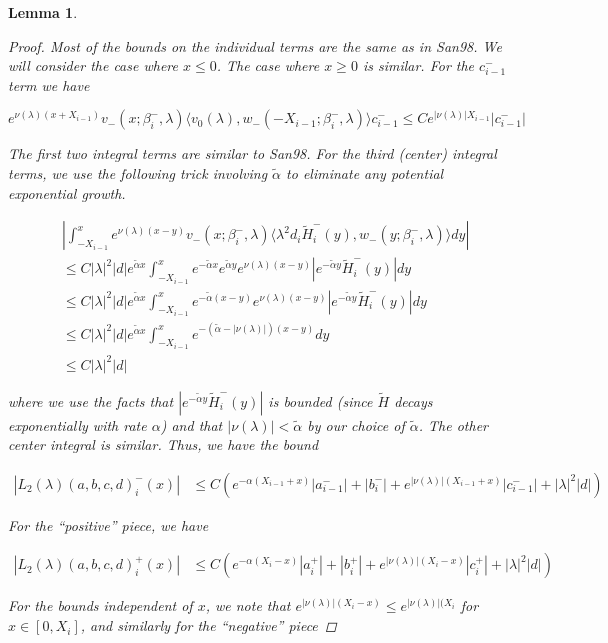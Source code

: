 \documentclass[12pt]{article}
\newtheorem{lemma}{Lemma}
\begin{document}
\begin{lemma}
\begin{proof}
Most of the bounds on the individual terms are the same as in San98. We will consider the case where $x \leq 0$. The case where $x \geq 0$ is similar. For the $c_{i-1}^-$ term we have

\[
e^{\nu(\lambda)(x+X_{i-1})} v_-(x; \beta_i^-, \lambda) \langle v_0(\lambda), w_-(-X_{i-1}; \beta_i^-, \lambda) \rangle c_{i-1}^- \leq C e^{|\nu(\lambda)| X_{i-1} }|c_{i-1}^-|
\]

The first two integral terms are similar to San98. For the third (center) integral terms, we use the following trick involving $\tilde{\alpha}$ to eliminate any potential exponential growth.

\begin{align*}
&\left| \int_{-X_{i-1}}^x 
e^{\nu(\lambda)(x-y)} v_-(x; \beta_i^-, \lambda) \langle \lambda^2 d_i \tilde{H}_i^-(y), w_-(y; \beta_i^-, \lambda) \rangle dy \right| \\
&\leq C |\lambda|^2 |d| e^{\tilde{\alpha}x} \int_{-X_{i-1}}^x e^{-\tilde{\alpha}x} e^{\tilde{\alpha}y} e^{\nu(\lambda)(x-y)} |e^{-\tilde{\alpha}y}\tilde{H}_i^-(y)|dy \\
&\leq C |\lambda|^2 |d| e^{\tilde{\alpha}x} \int_{-X_{i-1}}^x e^{-\tilde{\alpha}(x-y)} e^{\nu(\lambda)(x-y)} |e^{-\tilde{\alpha}y}\tilde{H}_i^-(y)| dy \\
&\leq C |\lambda|^2 |d| e^{\tilde{\alpha}x} \int_{-X_{i-1}}^x e^{-(\tilde{\alpha} - |\nu(\lambda)|)(x-y)} dy \\
&\leq C |\lambda|^2 |d|
\end{align*}

where we use the facts that $|e^{-\tilde{\alpha}y}\tilde{H}_i^-(y)|$ is bounded (since $\tilde{H}$ decays exponentially with rate $\alpha$) and that $|\nu(\lambda)| < \tilde{\alpha}$ by our choice of $\tilde{\alpha}$. The other center integral is similar. Thus, we have the bound 

\begin{align*}
|L_2(\lambda)(a,b,c,d)_i^-(x)| &\leq C (e^{-\alpha(X_{i-1} + x)}|a_{i-1}^-| + |b_i^-| + e^{|\nu(\lambda)|(X_{i-1} + x)} |c_{i-1}^-| + |\lambda|^2 |d| )
\end{align*}

For the ``positive'' piece, we have

\begin{align*}
|L_2(\lambda)(a,b,c,d)_i^+(x)| &\leq C (e^{-\alpha(X_i - x)}|a_i^+| + |b_i^+| + e^{|\nu(\lambda)|(X_i - x)} |c_i^+| + |\lambda|^2 |d| ) 
\end{align*}

For the bounds independent of $x$, we note that $e^{|\nu(\lambda)|(X_i - x)} \leq e^{|\nu(\lambda)|(X_i}$ for $x \in [0, X_i]$, and similarly for the ``negative'' piece

\end{proof}
\end{lemma}
\end{document}
